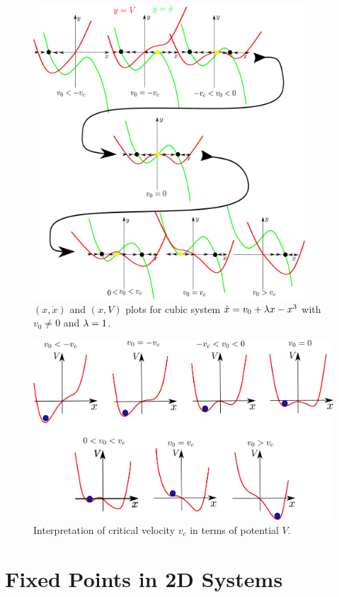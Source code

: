 \begin{figure}[h!]
\centering
\includegraphics[width=4in]
{dynamical-sys/phase-V-cubic-with-v0.png}
\caption{$(x, \dot{x})$ and $(x, V)$ plots for cubic system
$\dot{x}=v_0 + \lambda x-x^3$ with $v_0\neq 0$
and $\lambda=1$.}
\label{fig-phase-V-cubic-with-v0}
\end{figure}

\begin{figure}[h!]
\centering
\includegraphics[width=5in]
{dynamical-sys/rolling-ball.png}
\caption{Interpretation of
critical velocity $v_c$
in terms of potential $V$.}
\label{fig-rolling ball}
\end{figure}


\section{Fixed Points in 2D Systems}


